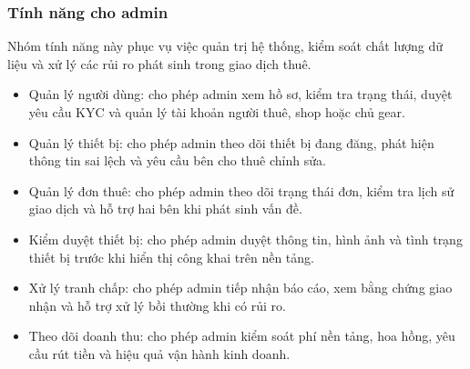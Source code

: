 \subsubsection{Tính năng cho admin}

Nhóm tính năng này phục vụ việc quản trị hệ thống, kiểm soát chất lượng dữ liệu và xử lý các rủi ro phát sinh trong giao dịch thuê.

\begin{itemize}
    \item Quản lý người dùng: cho phép admin xem hồ sơ, kiểm tra trạng thái, duyệt yêu cầu KYC và quản lý tài khoản người thuê, shop hoặc chủ gear.
    \item Quản lý thiết bị: cho phép admin theo dõi thiết bị đang đăng, phát hiện thông tin sai lệch và yêu cầu bên cho thuê chỉnh sửa.
    \item Quản lý đơn thuê: cho phép admin theo dõi trạng thái đơn, kiểm tra lịch sử giao dịch và hỗ trợ hai bên khi phát sinh vấn đề.
    \item Kiểm duyệt thiết bị: cho phép admin duyệt thông tin, hình ảnh và tình trạng thiết bị trước khi hiển thị công khai trên nền tảng.
    \item Xử lý tranh chấp: cho phép admin tiếp nhận báo cáo, xem bằng chứng giao nhận và hỗ trợ xử lý bồi thường khi có rủi ro.
    \item Theo dõi doanh thu: cho phép admin kiểm soát phí nền tảng, hoa hồng, yêu cầu rút tiền và hiệu quả vận hành kinh doanh.
\end{itemize}




    
    


    
